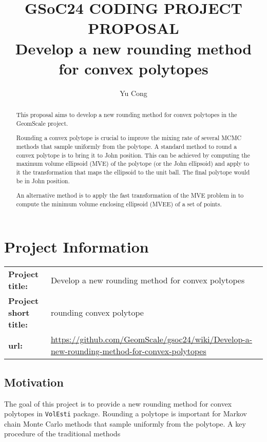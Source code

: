 \documentclass[11pt]{article}
\title{GSoC24 CODING PROJECT PROPOSAL \\ Develop a new rounding method for convex polytopes}
\author{Yu Cong}
\begin{document}
\maketitle
\begin{abstract}
    This proposal aims to develop a new rounding method for convex polytopes in the GeomScale project. 
    
    Rounding a convex polytope is crucial to improve the mixing rate of several MCMC methods that sample uniformly from the polytope. A standard method to round a convex polytope is to bring it to John position. This can be achieved by computing the maximum volume ellipsoid (MVE) of the polytope (or the John ellipsoid) and apply to it the transformation that maps the ellipsoid to the unit ball. The final polytope would be in John position.

    An alternative method is to apply the fast transformation of the MVE problem in \cite{Khachiyan_Todd_1993} to compute the minimum volume enclosing ellipsoid (MVEE) of a set of points.
\end{abstract}
\tableofcontents

\section{Project Information}
\begin{table}[H]
    \large
    \begin{tabular}{l p{12cm}}
        \textbf{Project title:} & Develop a new rounding method for convex polytopes\\ 
        \textbf{Project short title:} & rounding convex polytope\\
        \textbf{url:} & \url{https://github.com/GeomScale/gsoc24/wiki/Develop-a-new-rounding-method-for-convex-polytopes}\\
    \end{tabular}%
\end{table}

\subsection{Motivation}
The goal of this project is to provide a new rounding method for convex polytopes in \texttt{VolEsti} package. Rounding a polytope is important for Markov chain Monte Carlo methods that sample uniformly from the polytope. A key procedure of the traditional methods

\end{document}

